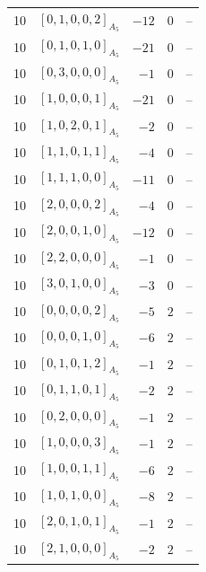 \documentclass[11pt]{article}
\newcommand{\Dynkin}[1]{#1}
\begin{document}
\begin{longtable}{r l r r l}
10 & $\Dynkin{[0,1,0,0,2]_{A_5}}$ & $-12$ & $0$ & --\\
10 & $\Dynkin{[0,1,0,1,0]_{A_5}}$ & $-21$ & $0$ & --\\
10 & $\Dynkin{[0,3,0,0,0]_{A_5}}$ & $-1$ & $0$ & --\\
10 & $\Dynkin{[1,0,0,0,1]_{A_5}}$ & $-21$ & $0$ & --\\
10 & $\Dynkin{[1,0,2,0,1]_{A_5}}$ & $-2$ & $0$ & --\\
10 & $\Dynkin{[1,1,0,1,1]_{A_5}}$ & $-4$ & $0$ & --\\
10 & $\Dynkin{[1,1,1,0,0]_{A_5}}$ & $-11$ & $0$ & --\\
10 & $\Dynkin{[2,0,0,0,2]_{A_5}}$ & $-4$ & $0$ & --\\
10 & $\Dynkin{[2,0,0,1,0]_{A_5}}$ & $-12$ & $0$ & --\\
10 & $\Dynkin{[2,2,0,0,0]_{A_5}}$ & $-1$ & $0$ & --\\
10 & $\Dynkin{[3,0,1,0,0]_{A_5}}$ & $-3$ & $0$ & --\\
10 & $\Dynkin{[0,0,0,0,2]_{A_5}}$ & $-5$ & $2$ & --\\
10 & $\Dynkin{[0,0,0,1,0]_{A_5}}$ & $-6$ & $2$ & --\\
10 & $\Dynkin{[0,1,0,1,2]_{A_5}}$ & $-1$ & $2$ & --\\
10 & $\Dynkin{[0,1,1,0,1]_{A_5}}$ & $-2$ & $2$ & --\\
10 & $\Dynkin{[0,2,0,0,0]_{A_5}}$ & $-1$ & $2$ & --\\
10 & $\Dynkin{[1,0,0,0,3]_{A_5}}$ & $-1$ & $2$ & --\\
10 & $\Dynkin{[1,0,0,1,1]_{A_5}}$ & $-6$ & $2$ & --\\
10 & $\Dynkin{[1,0,1,0,0]_{A_5}}$ & $-8$ & $2$ & --\\
10 & $\Dynkin{[2,0,1,0,1]_{A_5}}$ & $-1$ & $2$ & --\\
10 & $\Dynkin{[2,1,0,0,0]_{A_5}}$ & $-2$ & $2$ & --\\
\bottomrule\end{longtable}
\end{document}
